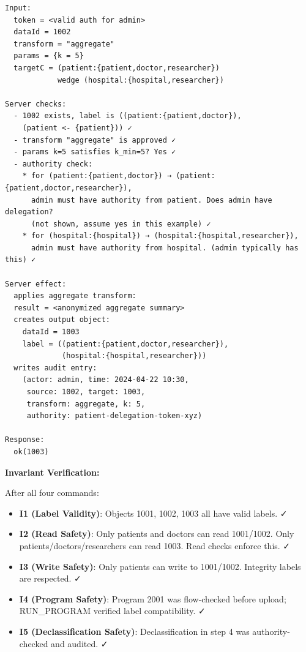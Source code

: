 \begin{verbatim}
Input:
  token = <valid auth for admin>
  dataId = 1002
  transform = "aggregate"
  params = {k = 5}
  targetC = (patient:{patient,doctor,researcher}) 
            wedge (hospital:{hospital,researcher})

Server checks:
  - 1002 exists, label is ((patient:{patient,doctor}), 
    (patient <- {patient})) ✓
  - transform "aggregate" is approved ✓
  - params k=5 satisfies k_min=5? Yes ✓
  - authority check:
    * for (patient:{patient,doctor}) → (patient:{patient,doctor,researcher}),
      admin must have authority from patient. Does admin have delegation?
      (not shown, assume yes in this example) ✓
    * for (hospital:{hospital}) → (hospital:{hospital,researcher}),
      admin must have authority from hospital. (admin typically has this) ✓
  
Server effect:
  applies aggregate transform:
  result = <anonymized aggregate summary>
  creates output object:
    dataId = 1003
    label = ((patient:{patient,doctor,researcher}), 
             (hospital:{hospital,researcher}))
  writes audit entry:
    (actor: admin, time: 2024-04-22 10:30, 
     source: 1002, target: 1003, 
     transform: aggregate, k: 5,
     authority: patient-delegation-token-xyz)
     
Response:
  ok(1003)
\end{verbatim}

\textbf{Invariant Verification:}

After all four commands:
\begin{itemize}
    \item \textbf{I1 (Label Validity)}: Objects 1001, 1002, 1003 all have valid labels. ✓
    \item \textbf{I2 (Read Safety)}: Only patients and doctors can read 1001/1002. Only patients/doctors/researchers can read 1003. Read checks enforce this. ✓
    \item \textbf{I3 (Write Safety)}: Only patients can write to 1001/1002. Integrity labels are respected. ✓
    \item \textbf{I4 (Program Safety)}: Program 2001 was flow-checked before upload; RUN\_PROGRAM verified label compatibility. ✓
    \item \textbf{I5 (Declassification Safety)}: Declassification in step 4 was authority-checked and audited. ✓
\end{itemize}
